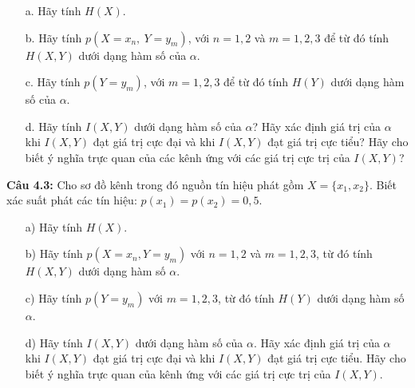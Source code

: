 \documentclass[12pt]{article}
\begin{document}
\begin{enumerate}
    \item[a.] Hãy tính $H(X)$.
    
    \item[b.] Hãy tính $p(X = x_n,\ Y = y_m)$, với $n = 1,2$ và $m = 1,2,3$ để từ đó tính $H(X,Y)$ dưới dạng hàm số của $\alpha$.
    
    \item[c.] Hãy tính $p(Y = y_m)$, với $m = 1,2,3$ để từ đó tính $H(Y)$ dưới dạng hàm số của $\alpha$.
    
    \item[d.] Hãy tính $I(X,Y)$ dưới dạng hàm số của $\alpha$? Hãy xác định giá trị của $\alpha$ khi $I(X,Y)$ đạt giá trị cực đại và khi $I(X,Y)$ đạt giá trị cực tiểu? Hãy cho biết ý nghĩa trực quan của các kênh ứng với các giá trị cực trị của $I(X,Y)$?
\end{enumerate}


\textbf{Câu 4.3:} Cho sơ đồ kênh trong đó nguồn tín hiệu phát gồm \( X = \{x_1, x_2\} \). Biết xác suất phát các tín hiệu: \( p(x_1) = p(x_2) = 0{,}5 \).
\begin{itemize}
    \item[a)] Hãy tính \( H(X) \).
    
    \item[b)] Hãy tính \( p(X = x_n, Y = y_m) \) với \( n = 1, 2 \) và \( m = 1, 2, 3 \), từ đó tính \( H(X, Y) \) dưới dạng hàm số \( \alpha \).
    
    \item[c)] Hãy tính \( p(Y = y_m) \) với \( m = 1, 2, 3 \), từ đó tính \( H(Y) \) dưới dạng hàm số \( \alpha \).
    
    \item[d)] Hãy tính \( I(X, Y) \) dưới dạng hàm số của \( \alpha \). Hãy xác định giá trị của \( \alpha \) khi \( I(X, Y) \) đạt giá trị cực đại và khi \( I(X, Y) \) đạt giá trị cực tiểu. Hãy cho biết ý nghĩa trực quan của kênh ứng với các giá trị cực trị của \( I(X, Y) \).
\end{itemize}
\end{document}
